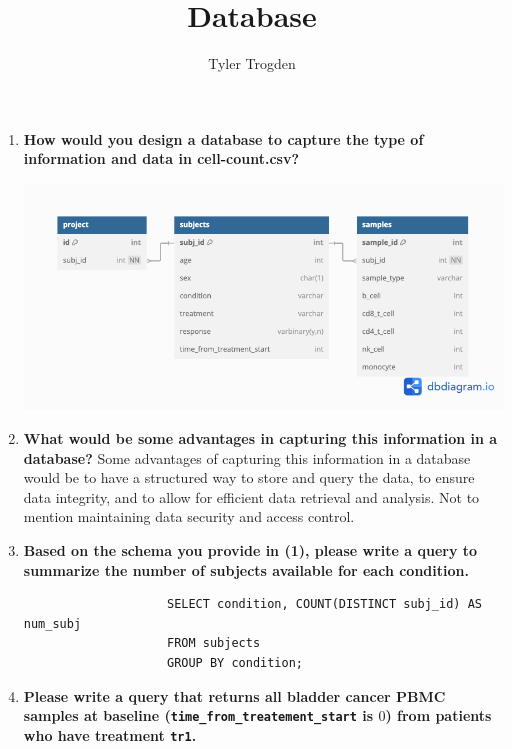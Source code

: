 \documentclass{article}
\title{Database}
\author{Tyler Trogden}
\begin{document}
\maketitle

    \begin{enumerate}
        \item  \textbf{How would you design a database to capture the type of information and data
               in cell-count.csv?}

                \includegraphics[width=1\textwidth]{db.png}

        \item \textbf{What would be some advantages in capturing this information in a database?}
              Some advantages of capturing this information in a database would be to have
              a structured way to store and query the data, to ensure data integrity, and
              to allow for efficient data retrieval and analysis. Not to mention maintaining
              data security and access control.

        \item \textbf{Based on the schema you provide in (1), please write a query to summarize the number of subjects 
              available for each condition.}

                \begin{verbatim}
                    SELECT condition, COUNT(DISTINCT subj_id) AS num_subj
                    FROM subjects
                    GROUP BY condition;
                \end{verbatim}

        \newpage

        \item \textbf{Please write a query that returns all bladder cancer PBMC samples at baseline
              (\texttt{time\_from\_treatement\_start} is $0$) from patients who have treatment \texttt{tr1}.}
              

\end{enumerate}
\end{document}
